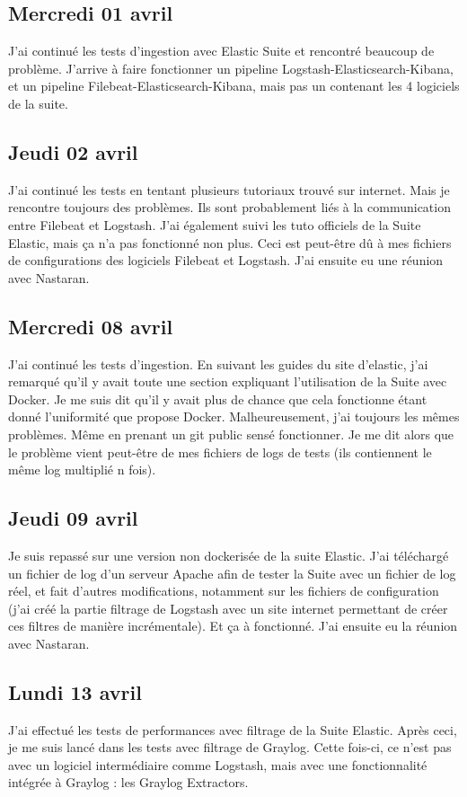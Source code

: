 \documentclass[paper=a4, fontsize=11pt]{scrartcl}
\begin{document}
\subsection{Mercredi 01 avril}
    J'ai continué les tests d'ingestion avec Elastic Suite et rencontré beaucoup de problème. J'arrive à faire fonctionner un pipeline Logstash-Elasticsearch-Kibana, et un pipeline Filebeat-Elasticsearch-Kibana, mais pas un contenant les 4 logiciels de la suite.
\subsection{Jeudi 02 avril}
    J'ai continué les tests en tentant plusieurs tutoriaux trouvé sur internet. Mais je rencontre toujours des problèmes. Ils sont probablement liés à la communication entre Filebeat et Logstash. J'ai également suivi les tuto officiels de la Suite Elastic, mais ça n'a pas fonctionné non plus. Ceci est peut-être dû à mes fichiers de configurations des logiciels Filebeat et Logstash. J'ai ensuite eu une réunion avec Nastaran.
\subsection{Mercredi 08 avril}
    J'ai continué les tests d'ingestion. En suivant les guides du site d'elastic, j'ai remarqué qu'il y avait toute une section expliquant l'utilisation de la Suite avec Docker. Je me suis dit qu'il y avait plus de chance que cela fonctionne étant donné l'uniformité que propose Docker. Malheureusement, j'ai toujours les mêmes problèmes. Même en prenant un git public sensé fonctionner. Je me dit alors que le problème vient peut-être de mes fichiers de logs de tests (ils contiennent le même log multiplié n fois).
\subsection{Jeudi 09 avril}
    Je suis repassé sur une version non dockerisée de la suite Elastic. J'ai téléchargé un fichier de log d'un serveur Apache afin de tester la Suite avec un fichier de log réel, et fait d'autres modifications, notamment sur les fichiers de configuration (j'ai créé la partie \og filtrage \fg de Logstash avec un site internet permettant de créer ces filtres de manière incrémentale). Et ça à fonctionné. J'ai ensuite eu la réunion avec Nastaran.
\subsection{Lundi 13 avril}
    J'ai effectué les tests de performances avec filtrage de la Suite Elastic. Après ceci, je me suis lancé dans les tests avec filtrage de Graylog. Cette fois-ci, ce n'est pas avec un logiciel intermédiaire comme Logstash, mais avec une fonctionnalité intégrée à Graylog : les Graylog Extractors.
\end{document}
